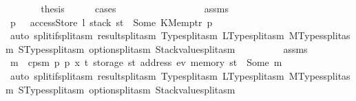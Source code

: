 \begin{isabellebody}
\ \ \ \ \isamarkupfalse%
\ \isamarkupfalse%
\ {\isacharquery}{\kern0pt}thesis\isanewline
\ \ \ \ \isamarkupfalse%
\ cases\isanewline
\ \ \ \ \ \ \isamarkupfalse%
\ {}{}\isanewline
\ \ \ \ \ \ \isamarkupfalse%
\ \isamarkupfalse%
\ assms\ {}\ {}{}\ \isamarkupfalse%
\ p{\isacharprime}{\kern0pt}\ \ {}{\isacharcolon}{\kern0pt}\ {\isachardoublequoteopen}accessStore\ l\ {\isacharparenleft}{\kern0pt}stack\ st{\isacharparenright}{\kern0pt}\ {\isacharequal}{\kern0pt}\ Some\ {\isacharparenleft}{\kern0pt}KMemptr\ p{\isacharprime}{\kern0pt}{\isacharparenright}{\kern0pt}{\isachardoublequoteclose}\isanewline
\ \ \ \ \ \ \ \ \isamarkupfalse%
\ {\isacharparenleft}{\kern0pt}auto\ split{\isacharcolon}{\kern0pt}if{\isacharunderscore}{\kern0pt}split{\isacharunderscore}{\kern0pt}asm\ result{\isachardot}{\kern0pt}split{\isacharunderscore}{\kern0pt}asm\ Type{\isachardot}{\kern0pt}split{\isacharunderscore}{\kern0pt}asm\ LType{\isachardot}{\kern0pt}split{\isacharunderscore}{\kern0pt}asm\ MTypes{\isachardot}{\kern0pt}split{\isacharunderscore}{\kern0pt}asm\ STypes{\isachardot}{\kern0pt}split{\isacharunderscore}{\kern0pt}asm\ option{\isachardot}{\kern0pt}split{\isacharunderscore}{\kern0pt}asm\ Stackvalue{\isachardot}{\kern0pt}split{\isacharunderscore}{\kern0pt}asm{\isacharparenright}{\kern0pt}\isanewline
\ \ \ \ \ \ \isamarkupfalse%
\ \isamarkupfalse%
\ assms\ {}\ {}{}\ {}\ {}\ \isamarkupfalse%
\ m\ \ {\isachardoublequoteopen}cps{}m\ p\ p{\isacharprime}{\kern0pt}\ x\ t\ {\isacharparenleft}{\kern0pt}storage\ st\ {\isacharparenleft}{\kern0pt}address\ ev{\isacharparenright}{\kern0pt}{\isacharparenright}{\kern0pt}\ {\isacharparenleft}{\kern0pt}memory\ st{\isacharparenright}{\kern0pt}\ {\isacharequal}{\kern0pt}\ Some\ m{\isachardoublequoteclose}\isanewline
\ \ \ \ \ \ \ \ \isamarkupfalse%
\ {\isacharparenleft}{\kern0pt}auto\ split{\isacharcolon}{\kern0pt}if{\isacharunderscore}{\kern0pt}split{\isacharunderscore}{\kern0pt}asm\ result{\isachardot}{\kern0pt}split{\isacharunderscore}{\kern0pt}asm\ Type{\isachardot}{\kern0pt}split{\isacharunderscore}{\kern0pt}asm\ LType{\isachardot}{\kern0pt}split{\isacharunderscore}{\kern0pt}asm\ MTypes{\isachardot}{\kern0pt}split{\isacharunderscore}{\kern0pt}asm\ STypes{\isachardot}{\kern0pt}split{\isacharunderscore}{\kern0pt}asm\ option{\isachardot}{\kern0pt}split{\isacharunderscore}{\kern0pt}asm\ Stackvalue{\isachardot}{\kern0pt}split{\isacharunderscore}{\kern0pt}asm{\isacharparenright}{\kern0pt}\isanewline

\end{isabellebody}
